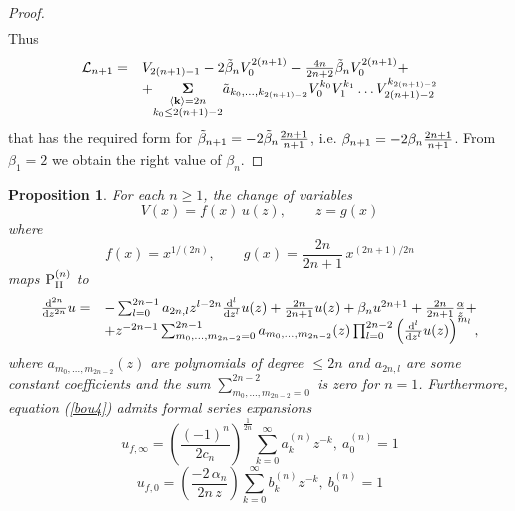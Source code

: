 \documentclass{amsart}
\newtheorem{proposition}[theorem]{Proposition}
\theoremstyle{definition}
\theoremstyle{remark}
\theoremstyle{remark}
\begin{document}
\begin{proof}
$$\begin{array}{ll}
\end{array}
$$
Thus
$$
\begin{array}{ll}
{\mathcal L}_{n+1} =& V_{2(n+1)-1}- 2\tilde\beta_n V_0^{2(n+1)} -
{4n\over2n+2}\tilde\beta_n V_0^{2(n+1)} +\\
&+ \underset{{\overset{
\scriptstyle \langle{\bf k}\rangle=2n}{\scriptstyle k_0\leq 2(n+1)-2}}}
{{\boldsymbol{\Sigma}}}
\tilde a_{k_0,\dots,k_{2(n+1)-2}} V_0^{k_0} V_1^{k_1}\dots
V_{2(n+1)-2}^{k_{2(n+1)-2}}\\
\end{array}
$$
that has the required form for
$\tilde\beta_{n+1}=-2\tilde\beta_n{2n+1\over n+1}$, i.e.
$\beta_{n+1}=-2\beta_n{2n+1\over n+1}$. From $\beta_1=2$ we obtain
the right value of $\beta_n$.
\end{proof}


\begin{proposition}
    For each $n\ge 1$, the change of variables
 \begin{equation}
    \label{boutroux}
    V(x)=f(x)\, u(z), \qquad  z=g(x)
    \end{equation}
where
    \[ f(x)=x^{1/(2n)},\qquad g(x)=\frac{2n}{2n+1}\,x^{(2n+1)/2n} \]
maps ${\rm P}^{(n)}_{\rm{\scriptstyle II}}$ to
\begin{equation}
\begin{array}{ll}
{{\rm d}^{2n}\over{\rm d} z^{2n}} u
=&-\sum_{l=0}^{2n-1} a_{2n,l}z^{l-2n}
{{\rm d}^l\over{\rm d} z^l} u(z)+{2n\over 2n+1} u(z) +
\beta_n u^{2n+1}+{2n\over 2n+1}{\alpha\over z}+\\
&+z^{-2n-1}\sum_{m_0,\dots,m_{2n-2}=0}^{2n-1}
a_{m_0,\dots,m_{2n-2}}(z)\prod_{l=0}^{2n-2}
\left({{\rm d}^l\over{\rm d} z^l} u(z)\right)^{m_l},\\
\end{array}
\label{bou4}\end{equation}
where $a_{m_0,\dots,m_{2n-2}}(z)$ are
polynomials of degree $\le 2n$ and $a_{2n,l}$ are some constant
coefficients and the sum $\sum_{m_0,\dots,m_{2n-2}=0}^{2n-2}$ is
zero for $n=1$. Furthermore, equation (\ref{bou4})
admits formal series expansions
\begin{equation}
\label{series1}
        u_{f, \infty}=\left(\frac{(-1)^{n}}{2c_{n}}\right)^{\frac{1}{2n}}
        \sum_{k=0}^{\infty} a_{k}^{(n)}z^{-k},\ a_{0}^{(n)}=1
        \end{equation}
\begin{equation}
     \label{series2}
u_{f, 0}=\left(\frac{-2\,\alpha_{n}}{2n\,z}\right)
        \sum_{k=0}^{\infty} b_{k}^{(n)}z^{-k},\ b_{0}^{(n)}=1
        \end{equation}
  \end{proposition}
\end{document}
